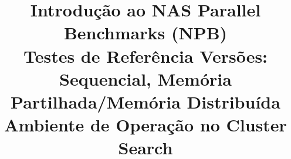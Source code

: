\documentclass[conference,compsoc]{IEEEtran}
\begin{document}
%
\title{Introdução ao NAS Parallel Benchmarks (NPB)\\Testes de Referência Versões: Sequencial, Memória Partilhada/Memória Distribuída\\Ambiente de Operação no Cluster Search}


\author{
}


% 
\end{document}
